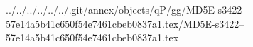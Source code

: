 ../../../../../../.git/annex/objects/qP/gg/MD5E-s3422--57e14a5b41c650f54e7461cbeb0837a1.tex/MD5E-s3422--57e14a5b41c650f54e7461cbeb0837a1.tex